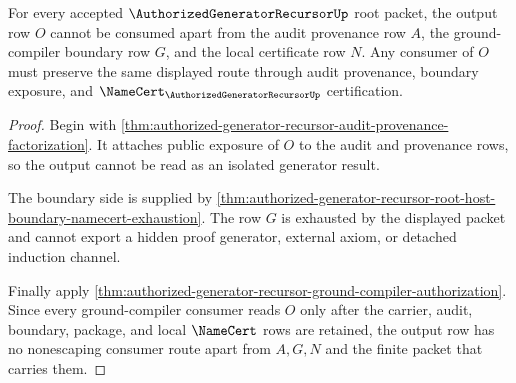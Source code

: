 \begin{theorem}
\label{thm:authorized-generator-recursor-output-audit-nonescape}
For every accepted $\AuthorizedGeneratorRecursorUp$ root packet, the output row $O$ cannot be consumed apart from the audit provenance row $A$, the ground-compiler boundary row $G$, and the local certificate row $N$. Any consumer of $O$ must preserve the same displayed route through audit provenance, boundary exposure, and $\NameCert_{\AuthorizedGeneratorRecursorUp}$ certification.
\end{theorem}
\begin{proof}
Begin with \autoref{thm:authorized-generator-recursor-audit-provenance-factorization}. It attaches public exposure of $O$ to the audit and provenance rows, so the output cannot be read as an isolated generator result.

The boundary side is supplied by \autoref{thm:authorized-generator-recursor-root-host-boundary-namecert-exhaustion}. The row $G$ is exhausted by the displayed packet and cannot export a hidden proof generator, external axiom, or detached induction channel.

Finally apply \autoref{thm:authorized-generator-recursor-ground-compiler-authorization}. Since every ground-compiler consumer reads $O$ only after the carrier, audit, boundary, package, and local $\NameCert$ rows are retained, the output row has no nonescaping consumer route apart from $A,G,N$ and the finite packet that carries them.
\end{proof}

